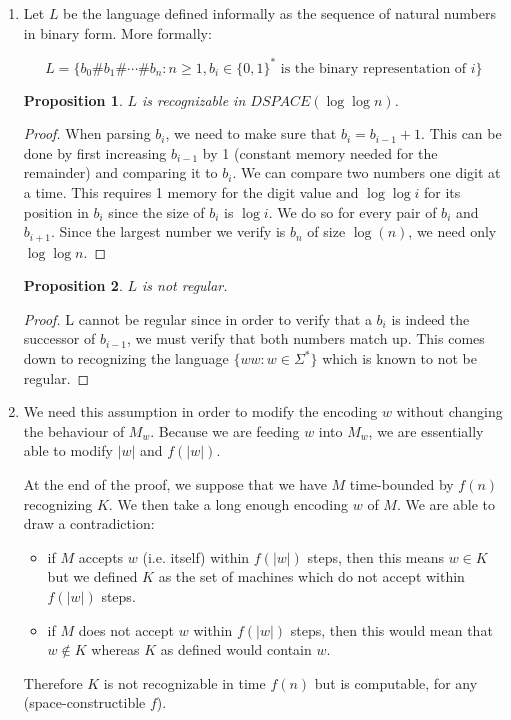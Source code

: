 \documentclass{article}
\newtheorem{proposition}{Proposition}
\begin{document}
\begin{enumerate}
\begin{proof}
\end{proof}

\item Let $L$ be the language defined informally as the sequence of natural numbers in binary form. More formally:

$$
L = \{b_0\#b_1\#\cdots\#b_n : n\geq1,b_i\in \{0,1\}^* \text{ is the binary representation of }i \}
$$

\begin{proposition}$L$ is recognizable in $DSPACE(\log \log n)$.\end{proposition}
\begin{proof}
When parsing $b_i$, we need to make sure that $b_i=b_{i-1}+1$. This can be done by first increasing $b_{i-1}$ by 1 (constant memory needed for the remainder) and comparing it to $b_i$. We can compare two numbers one digit at a time. This requires 1 memory for the digit value and $\log\log i$ for its position in $b_i$ since the size of $b_i$ is $\log i$. We do so for every pair of $b_i$ and $b_{i+1}$. Since the largest number we verify is $b_n$ of size $\log(n)$, we need only $\log\log n$. %
\end{proof}
\begin{proposition}$L$ is not regular.\end{proposition}
\begin{proof}
L cannot be regular since in order to verify that a $b_i$ is indeed the successor of $b_{i-1}$, we must verify that both numbers match up. This comes down to recognizing the language $\{ww:w\in\Sigma^*\}$ which is known to not be regular.
\end{proof}


\item We need this assumption in order to modify the encoding $w$ without changing the behaviour of $M_w$. Because we are feeding $w$ into $M_w$, we are essentially able to modify $|w|$ and $f(|w|)$.

At the end of the proof, we suppose that we have $M$ time-bounded by $f(n)$ recognizing $K$. We then take a long enough encoding $w$ of $M$. We are able to draw a contradiction:
\begin{itemize}
\item if $M$ accepts $w$ (i.e. itself) within $f(|w|)$ steps, then this means $w \in K$ but we defined $K$ as the set of machines which do not accept within $f(|w|)$ steps.
\item if $M$ does not accept $w$ within $f(|w|)$ steps, then this would mean that $w \not\in K$ whereas $K$ as defined would contain $w$.
\end{itemize}
Therefore $K$ is not recognizable in time $f(n)$ but is computable, for any (space-constructible $f$).

\end{enumerate}
\end{document}
